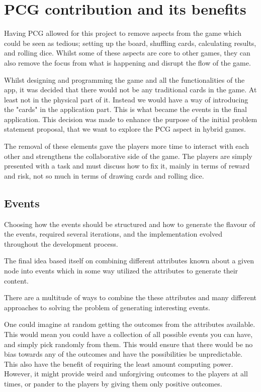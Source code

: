 \section{PCG contribution and its benefits}
\label{sec:pcgben}
Having PCG allowed for this project to remove aspects from the game which could be seen as tedious; setting up the board, shuffling cards, calculating results, and rolling dice. Whilst some of these aspects are core to other games, they can also remove the focus from what is happening and disrupt the flow of the game.

Whilst designing and programming the game and all the functionalities of the app, it was decided that there would not be any traditional cards in the game. At least not in the physical part of it. Instead we would have a way of introducing the "cards" in the application part.
This is what became the events in the final application. This decision was made to enhance the purpose of the initial problem statement proposal, that we want to explore the PCG aspect in hybrid games.

The removal of these elements gave the players more time to interact with each other and strengthens the collaborative side of the game. The players are simply presented with a task and must discuss how to fix it, mainly in terms of reward and risk, not so much in terms of drawing cards and rolling dice.

\subsection{Events}
Choosing how the events should be structured and how to generate the flavour of the events, required several iterations, and the implementation evolved throughout the development process.

The final idea based itself on combining different attributes known about a given node into events which in some way utilized the attributes to generate their content. 

There are a multitude of ways to combine the these attributes and many different approaches to solving the problem of generating interesting events.

One could imagine at random getting the outcomes from the attributes available. 
This would mean you could have a collection of all possible events you can have, and simply pick randomly from them. 
This would ensure that there would be no bias towards any of the outcomes and have the possibilities be unpredictable. This also have the benefit of requiring the least amount computing power. 
However, it might provide weird and unforgiving outcomes to the players at all times, or pander to the players by giving them only positive outcomes.

